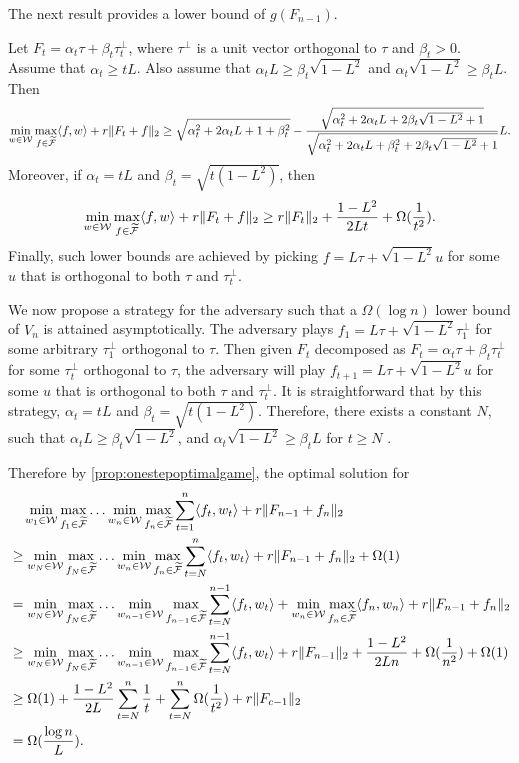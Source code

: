 The next result provides a lower bound of $g(F_{n-1})$.
\begin{prop}
	\label{prop:onestepoptimalgame}
	Let $F_t = \alpha_t\tau + \beta_t\tau^{\perp}_t$, where $\tau^{\perp}$ is a unit vector orthogonal to $\tau$ and $\beta_t >0$. Assume that $\alpha_t \ge tL$.
	Also assume that $\alpha_tL\ge\beta_t\sqrt{1-L^2}$ and $\alpha_t\sqrt{1-L^2}\ge\beta_tL$.
	Then 
	\[
	\min_{w\in\mathcal{W}}\max_{f\in\widetilde{\mathcal{F}}} \langle f, w\rangle + r\|F_t+f\|_2 \ge  \sqrt{\alpha_t^2 + 2\alpha_tL + 1+\beta_t^2} - \frac{\sqrt{\alpha_t^2+2\alpha_tL + 2\beta_t\sqrt{1-L^2} + 1}}{\sqrt{\alpha_t^2+2\alpha_tL + \beta_t^2 + 2\beta_t\sqrt{1-L^2} + 1}}L.
	\]
	Moreover, if $\alpha_t = tL$ and $\beta_t = \sqrt{t(1-L^2)}$, then
	\[
	\min_{w\in\mathcal{W}}\max_{f\in\widetilde{\mathcal{F}}} \langle f, w\rangle + r\|F_t+f\|_2 \ge r\|F_t\|_2 + \frac{1-L^2}{2Lt}+ \Omega(\frac{1}{t^2}).
	\]
	Finally, such lower bounds are achieved by picking $f = L\tau + \sqrt{1-L^2}u$ for some $u$ that is orthogonal to both $\tau$ and $\tau_t^\perp$.
\end{prop}



We now propose a strategy for the adversary such that a $\Omega(\log n)$ lower bound of $V_n$ is attained asymptotically.
The adversary plays $f_1 = L\tau + \sqrt{1-L^2}\tau_1^{\perp}$ for some arbitrary $\tau_1^{\perp}$ orthogonal to $\tau$. 
Then given $F_t$ decomposed as $ F_t= \alpha_t\tau + \beta_t \tau_t^{\perp}$ for some $\tau_t^{\perp}$ orthogonal to $\tau$, the adversary will play $f_{t+1}= L\tau + \sqrt{1-L^2}u$ for some $u$ that is orthogonal to both $\tau$ and $\tau_t^\perp$.
It is straightforward that by this strategy, $\alpha_t = tL$ and $\beta_t = \sqrt{t(1-L^2)}$.
Therefore, there exists a constant $N$, such that $\alpha_tL\ge \beta_t\sqrt{1-L^2}$, and $\alpha_t\sqrt{1-L^2}\ge \beta_tL$ for $t\ge N$ .

Therefore by \cref{prop:onestepoptimalgame}, the optimal solution for 
\begin{align*}
& \quad \min_{w_1\in\mathcal{W}}\max_{f_1\in\widetilde{\mathcal{F}}}\ldots\min_{w_n\in\mathcal{W}}\max_{f_n\in\widetilde{\mathcal{F}}} \sum_{t=1}^{n} \langle f_t, w_t\rangle +r \|F_{n-1} + f_n\|_2 \\
& \ge \min_{w_N\in\mathcal{W}}\max_{f_N\in\widetilde{\mathcal{F}}}\ldots\min_{w_n\in\mathcal{W}}\max_{f_n\in\widetilde{\mathcal{F}}} \sum_{t=N}^{n} \langle f_t, w_t\rangle +r \|F_{n-1} + f_n\|_2 + \Omega(1)\\
& = \min_{w_N\in\mathcal{W}}\max_{f_N\in\widetilde{\mathcal{F}}}\ldots\min_{w_{n-1}\in\mathcal{W}}\max_{f_{n-1}\in\widetilde{\mathcal{F}}} \sum_{t=N}^{n-1} \langle f_t, w_t\rangle + \min_{w_n\in\mathcal{W}}\max_{f_n\in\widetilde{\mathcal{F}}} \langle f_n, w_n\rangle +r \|F_{n-1} + f_n\|_2 \\
& \ge \min_{w_N\in\mathcal{W}}\max_{f_N\in\widetilde{\mathcal{F}}}\ldots\min_{w_{n-1}\in\mathcal{W}}\max_{f_{n-1}\in\widetilde{\mathcal{F}}} \sum_{t=N}^{n-1} \langle f_t, w_t\rangle + r\|F_{n-1}\|_2+\frac{1-L^2}{2Ln}+\Omega(\frac{1}{n^2})+\Omega(1) \\
& \ge \Omega(1)+ \frac{1-L^2}{2L}\sum_{t=N}^{n}\frac{1}{t} + \sum_{t=N}^{n}\Omega(\frac{1}{t^2}) + r\|F_{c-1}\|_2 \\
& =\Omega(\frac{\log n}{L}).
\end{align*}

